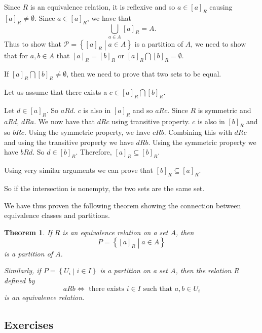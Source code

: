 \documentclass[
]{book}
\newtheorem{theorem}{Theorem}[chapter]
\theoremstyle{definition}
\theoremstyle{definition}
\theoremstyle{definition}
\theoremstyle{remark}
\begin{document}
Since \(R\) is an equivalence relation, it is reflexive and so \(a \in [a]_R\) causing \([a]_R \neq \emptyset\). Since \(a\in [a]_R\), we have that \[\bigcup_{a\in A} [a]_R = A.\] Thus to show that \(\mathcal{P} = \left\{ [a]_R \middle \vert a \in A\right\}\) is a partition of \(A\), we need to show that for \(a,b\in A\) that \([a]_R=[b]_R\) or \([a]_R\bigcap [b]_R = \emptyset\).

If \([a]_R \bigcap [b]_R \neq \emptyset\), then we need to prove that two sets to be equal.

Let us assume that there exists a \(c\in [a]_R \bigcap [b]_R\).

Let \(d\in [a]_R\). So \(a R d\). \(c\) is also in \([a]_R\) and so \(aRc\). Since \(R\) is symmetric and \(aRd\), \(dRa\). We now have that \(dR c\) using transitive property. \(c\) is also in \([b]_R\) and so \(bRc\). Using the symmetric property, we have \(cR b\). Combining this with \(dRc\) and using the transitive property we have \(dR b\). Using the symmetric property we have \(bR d\). So \(d\in [b]_R\). Therefore, \([a]_R \subseteq [b]_R\).

Using very similar arguments we can prove that \([b]_R \subseteq [a]_R\).

So if the intersection is nonempty, the two sets are the same set.

We have thus proven the following theorem showing the connection between equivalence classes and partitions.

\begin{theorem}
\protect\hypertarget{thm:unnamed-chunk-44}{}{\label{thm:unnamed-chunk-44} }If \(R\) is an equivalence relation on a set \(A\), then \[P = \left\{ [a]_R \middle \vert a \in A\right\}\] is a partition of \(A\).

Similarly, if \(P= \left\{ U_i \middle \vert i \in I\right\}\) is a partition on a set \(A\), then the relation \(R\) defined by
\[aRb \Leftrightarrow \mbox{ there exists } i \in I \mbox{ such that } a,b \in U_i\] is an equivalence relation.
\end{theorem}

\hypertarget{exercises-6}{%
\subsection{Exercises}\label{exercises-6}}
\end{document}
